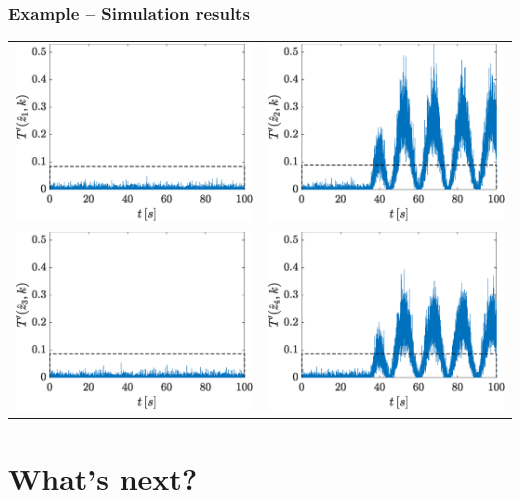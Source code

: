 \documentclass[presentation]{beamer}
\begin{document}
\begin{frame}
	\frametitle{Example -- Simulation results}
	\vspace{2ex}
	\centering
	\begin{tabular}{lr}
		\includegraphics[width=0.4\linewidth]{fig/det1_okThr.eps} & \includegraphics[width=0.4\linewidth]{fig/det2_okThr.eps} \\
		\includegraphics[width=0.4\linewidth]{fig/det3_okThr.eps} & \includegraphics[width=0.4\linewidth]{fig/det4_okThr.eps}
	\end{tabular}	
\end{frame}

\section{What's next?}

\end{document}
